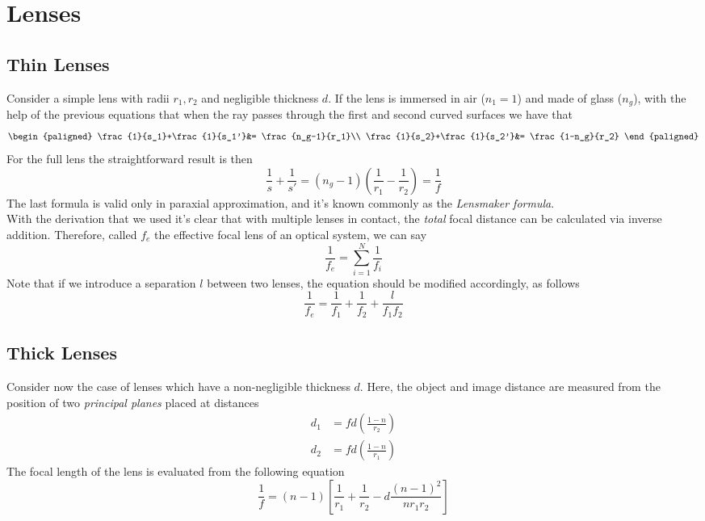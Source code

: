 \documentclass[../electromagnetism.tex]{subfiles}
\begin{document}
\section{Lenses}
\subsection{Thin Lenses}
Consider a simple lens with radii $r_1, r_2$ and negligible thickness $d$. If the lens is immersed in air ($n_1=1$) and made of glass ($n_g$), with the help of the previous equations that when the ray passes through the first and second curved surfaces we have that
\begin{equation}
	\begin{paligned}
		\frac{1}{s_1}+\frac{1}{s_1'}&= \frac{n_g-1}{r_1}\\
		\frac{1}{s_2}+\frac{1}{s_2'}&= \frac{1-n_g}{r_2}
	\end{paligned}
	\label{eq:mirroreqn-thin1.lens}
\end{equation}
For the full lens the straightforward result is then
\begin{equation}
	\frac{1}{s}+\frac{1}{s'}=(n_g-1)\left( \frac{1}{r_1}-\frac{1}{r_2} \right)=\frac{1}{f}
	\label{eq:lensmaker.lens}
\end{equation}
The last formula is valid only in paraxial approximation, and it's known commonly as the \textit{Lensmaker formula}.\\
With the derivation that we used it's clear that with multiple lenses in contact, the \textit{total} focal distance can be calculated via inverse addition. Therefore, called $f_e$ the effective focal lens of an optical system, we can say
\begin{equation}
	\frac{1}{f_e}=\sum_{i=1}^N\frac{1}{f_i}
	\label{eq:contact-lensmaker.lens}
\end{equation}
Note that if we introduce a separation $l$ between two lenses, the equation should be modified accordingly, as follows
\begin{equation}
	\frac{1}{f_e}=\frac{1}{f_1}+\frac{1}{f_2}+\frac{l}{f_1f_2}
	\label{eq:distance-lensmaker.lens}
\end{equation}
\subsection{Thick Lenses}
Consider now the case of lenses which have a non-negligible thickness $d$. Here, the object and image distance are measured from the position of two \textit{principal planes} placed at distances
\begin{equation}
	\begin{aligned}
		d_1&= fd\left( \frac{1-n}{r_2} \right)\\
		d_2&= fd\left( \frac{1-n}{r_1} \right)
	\end{aligned}
	\label{eq:principal-thick.lens}
\end{equation}
The focal length of the lens is evaluated from the following equation
\begin{equation}
	\frac{1}{f}=(n-1)\left[ \frac{1}{r_1}+\frac{1}{r_2}-d\frac{(n-1)^2}{nr_1r_2} \right]
	\label{eq:focal-thick.lens}
\end{equation}
\end{document}
